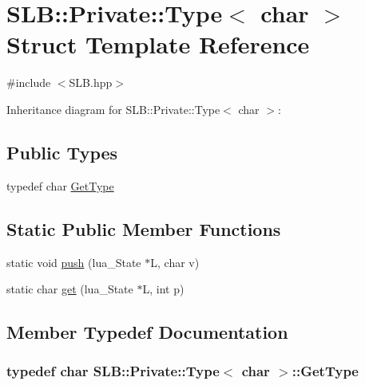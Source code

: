 \hypertarget{structSLB_1_1Private_1_1Type_3_01char_01_4}{}\section{S\+LB\+:\+:Private\+:\+:Type$<$ char $>$ Struct Template Reference}
\label{structSLB_1_1Private_1_1Type_3_01char_01_4}


{\ttfamily \#include $<$S\+L\+B.\+hpp$>$}



Inheritance diagram for S\+LB\+:\+:Private\+:\+:Type$<$ char $>$\+:
\subsection*{Public Types}
\begin{DoxyCompactItemize}
\item 
typedef char \hyperlink{structSLB_1_1Private_1_1Type_3_01char_01_4_ac7fe7464c8690f82b13ef6ddf6ea11eb}{Get\+Type}
\end{DoxyCompactItemize}
\subsection*{Static Public Member Functions}
\begin{DoxyCompactItemize}
\item 
static void \hyperlink{structSLB_1_1Private_1_1Type_3_01char_01_4_aac1cdc26631bc08095ed9fa585ff1d90}{push} (lua\+\_\+\+State $\ast$L, char v)
\item 
static char \hyperlink{structSLB_1_1Private_1_1Type_3_01char_01_4_a0aa5a21da661dbd94b40fda661d757cf}{get} (lua\+\_\+\+State $\ast$L, int p)
\end{DoxyCompactItemize}


\subsection{Member Typedef Documentation}
\subsubsection[{\texorpdfstring{Get\+Type}{GetType}}]{\setlength{\rightskip}{0pt plus 5cm}typedef char {\bf S\+L\+B\+::\+Private\+::\+Type}$<$ char $>$\+::{\bf Get\+Type}}\hypertarget{structSLB_1_1Private_1_1Type_3_01char_01_4_ac7fe7464c8690f82b13ef6ddf6ea11eb}{}\label{structSLB_1_1Private_1_1Type_3_01char_01_4_ac7fe7464c8690f82b13ef6ddf6ea11eb}


